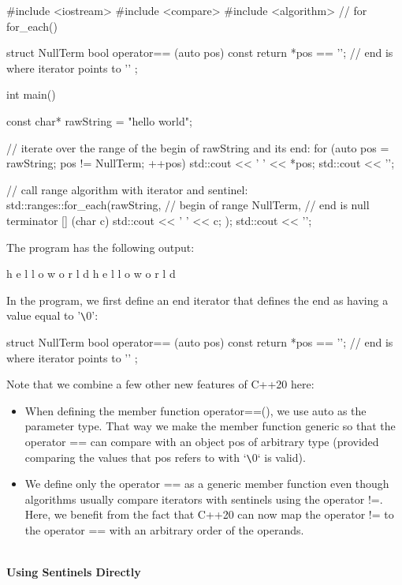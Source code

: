 \begin{cpp}
#include <iostream>
#include <compare>
#include <algorithm> // for for_each()

struct NullTerm {
	bool operator== (auto pos) const {
		return *pos == '\0'; // end is where iterator points to ’\0’
	}
};

int main()
{
	const char* rawString = "hello world";
	
	// iterate over the range of the begin of rawString and its end:
	for (auto pos = rawString; pos != NullTerm{}; ++pos) {
		std::cout << ' ' << *pos;
	}
	std::cout << '\n';
	
	// call range algorithm with iterator and sentinel:
	std::ranges::for_each(rawString, // begin of range
				NullTerm{}, // end is null terminator
				[] (char c) {
					std::cout << ' ' << c;
				});
	std::cout << '\n';
}
\end{cpp}

The program has the following output:

\begin{shell}
h e l l o   w o r l d
h e l l o   w o r l d
\end{shell}

In the program, we first define an end iterator that defines the end as having a value equal to ’\verb|\|0’:

\begin{cpp}
struct NullTerm {
	bool operator== (auto pos) const {
		return *pos == '\0'; // end is where iterator points to ’\0’
	}
};
\end{cpp}

Note that we combine a few other new features of C++20 here:

\begin{itemize}
\item
When defining the member function operator==(), we use auto as the parameter type. That way we make the member function generic so that the operator == can compare with an object pos of arbitrary type (provided comparing the values that pos refers to with ‘\verb|\|0‘ is valid).

\item
We define only the operator == as a generic member function even though algorithms usually compare iterators with sentinels using the operator !=. Here, we benefit from the fact that C++20 can now map the operator != to the operator == with an arbitrary order of the operands.
\end{itemize}

\noindent
\hspace*{\fill} \\ %
\textbf{Using Sentinels Directly}


